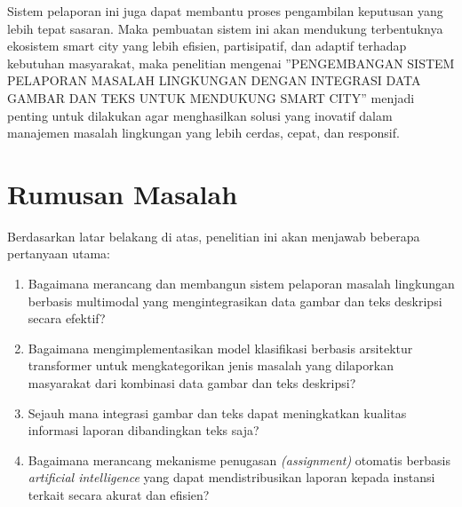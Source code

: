 Sistem pelaporan ini juga dapat membantu proses pengambilan keputusan yang lebih tepat sasaran. Maka pembuatan sistem ini akan mendukung terbentuknya ekosistem smart city yang lebih efisien, partisipatif, dan adaptif terhadap kebutuhan masyarakat, maka penelitian mengenai ”PENGEMBANGAN SISTEM PELAPORAN MASALAH LINGKUNGAN DENGAN INTEGRASI DATA GAMBAR DAN TEKS UNTUK MENDUKUNG SMART CITY” menjadi penting untuk dilakukan agar menghasilkan solusi yang inovatif dalam manajemen masalah lingkungan yang lebih cerdas, cepat, dan responsif. 

\section{Rumusan Masalah}
Berdasarkan latar belakang di atas, penelitian ini akan menjawab beberapa pertanyaan utama: 
\begin{enumerate}
    \item Bagaimana merancang dan membangun sistem pelaporan masalah lingkungan berbasis multimodal yang mengintegrasikan data gambar dan teks deskripsi secara efektif? 
    \item Bagaimana mengimplementasikan model klasifikasi berbasis arsitektur transformer untuk mengkategorikan jenis masalah yang dilaporkan masyarakat dari kombinasi data gambar dan teks deskripsi?
    \item Sejauh mana integrasi gambar dan teks dapat meningkatkan kualitas informasi laporan dibandingkan teks saja?  
    \item Bagaimana merancang mekanisme penugasan \textit{(assignment)} otomatis berbasis \textit {artificial intelligence} yang dapat mendistribusikan laporan kepada instansi terkait secara akurat dan efisien? 
\end{enumerate}

